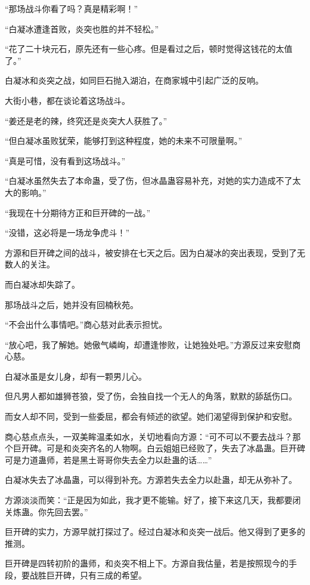 
\begin{this_body}

“那场战斗你看了吗？真是精彩啊！”

“白凝冰遭逢首败，炎突也胜的并不轻松。”

“花了二十块元石，原先还有一些心疼。但是看过之后，顿时觉得这钱花的太值了。”

白凝冰和炎突之战，如同巨石抛入湖泊，在商家城中引起广泛的反响。

大街小巷，都在谈论着这场战斗。

“姜还是老的辣，终究还是炎突大人获胜了。”

“但白凝冰虽败犹荣，能够打到这种程度，她的未来不可限量啊。”

“真是可惜，没有看到这场战斗。”

“白凝冰虽然失去了本命蛊，受了伤，但冰晶蛊容易补充，对她的实力造成不了太大的影响。”

“我现在十分期待方正和巨开碑的一战。”

“没错，这必将是一场龙争虎斗！”

方源和巨开碑之间的战斗，被安排在七天之后。因为白凝冰的突出表现，受到了无数人的关注。

而白凝冰却失踪了。

那场战斗之后，她并没有回楠秋苑。

“不会出什么事情吧。”商心慈对此表示担忧。

“放心吧，我了解她。她傲气嶙峋，却遭逢惨败，让她独处吧。”方源反过来安慰商心慈。

白凝冰虽是女儿身，却有一颗男儿心。

但凡男人都如雄狮苍狼，受了伤，会独自找一个无人的角落，默默的舔舐伤口。

而女人却不同，受到一些委屈，都会有倾述的欲望。她们渴望得到保护和安慰。

商心慈点点头，一双美眸温柔如水，关切地看向方源：“可不可以不要去战斗？那个巨开碑。可是和炎突齐名的人物啊。白云姐姐已经败了，失去了冰晶蛊。巨开碑可是力道蛊师，若是黑土哥哥你失去全力以赴蛊的话……”

白凝冰失去了冰晶蛊，可以得到补充。方源若失去全力以赴蛊，却无从弥补了。

方源淡淡而笑：“正是因为如此，我才更不能输。好了，接下来这几天，我都要闭关炼蛊。你先回去罢。”

巨开碑的实力，方源早就打探过了。经过白凝冰和炎突一战后。他又得到了更多的推测。

巨开碑是四转初阶的蛊师，和炎突不相上下。方源自我估量，若是按照现今的手段，要战胜巨开碑，只有三成的希望。


\end{this_body}
